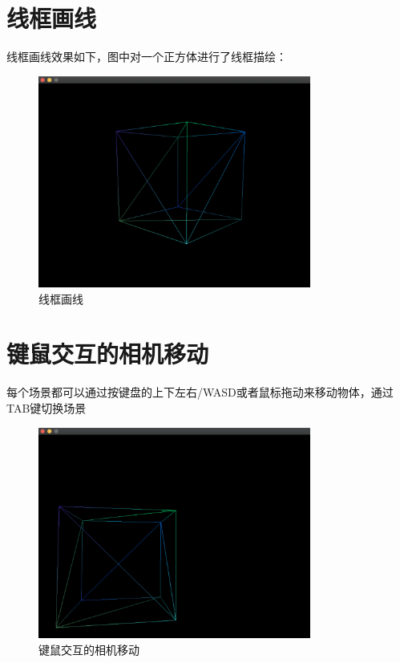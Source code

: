    \section{线框画线}
    线框画线效果如下，图中对一个正方体进行了线框描绘：
     \begin{figure}[H]
    	\centering
		\includegraphics[width=0.8\textwidth]{images/demo3.png}
		\caption{线框画线}
		\label{demo3}
    \end{figure}  
    
    \section{键鼠交互的相机移动}
    每个场景都可以通过按键盘的上下左右/WASD或者鼠标拖动来移动物体，通过TAB键切换场景
     \begin{figure}[H]
    	\centering
		\includegraphics[width=0.8\textwidth]{images/demo4.png}
		\caption{键鼠交互的相机移动}
		\label{demo4}
    \end{figure}  
 
